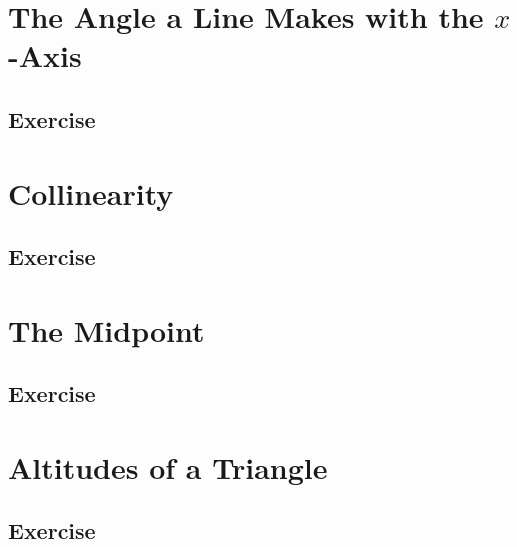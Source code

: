 \documentclass[
  11pt,
  openany]{book}
\begin{document}
\newpage

\section{\texorpdfstring{The Angle a Line Makes with the \(x\)-Axis}{The Angle a Line Makes with the x-Axis}}\label{the-angle-a-line-makes-with-the-x-axis}

\newpage

\subsection*{Exercise}\label{exercise-2}

\newpage

\section{Collinearity}\label{collinearity}

\newpage

\subsection*{Exercise}\label{exercise-3}

\newpage

\section{The Midpoint}\label{the-midpoint}

\newpage

\subsection*{Exercise}\label{exercise-4}

\newpage

\section{Altitudes of a Triangle}\label{altitudes-of-a-triangle}

\newpage

\subsection*{Exercise}\label{exercise-5}
\end{document}
